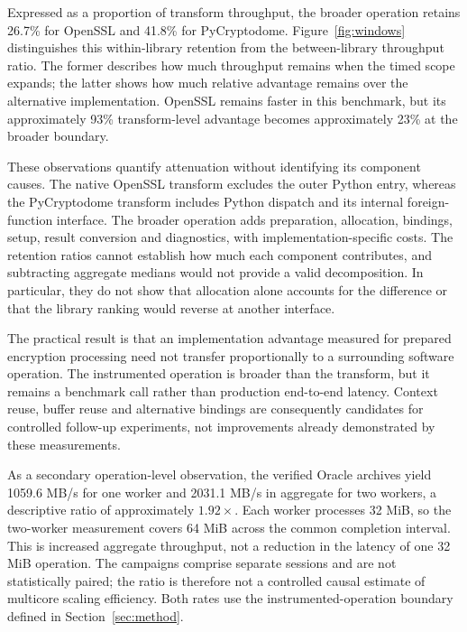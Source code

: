 Expressed as a proportion of transform throughput, the broader operation retains 26.7\% for OpenSSL and 41.8\% for PyCryptodome. Figure~\ref{fig:windows} distinguishes this within-library retention from the between-library throughput ratio. The former describes how much throughput remains when the timed scope expands; the latter shows how much relative advantage remains over the alternative implementation. OpenSSL remains faster in this benchmark, but its approximately 93\% transform-level advantage becomes approximately 23\% at the broader boundary.

These observations quantify attenuation without identifying its component causes. The native OpenSSL transform excludes the outer Python entry, whereas the PyCryptodome transform includes Python dispatch and its internal foreign-function interface. The broader operation adds preparation, allocation, bindings, setup, result conversion and diagnostics, with implementation-specific costs. The retention ratios cannot establish how much each component contributes, and subtracting aggregate medians would not provide a valid decomposition. In particular, they do not show that allocation alone accounts for the difference or that the library ranking would reverse at another interface.

The practical result is that an implementation advantage measured for prepared encryption processing need not transfer proportionally to a surrounding software operation. The instrumented operation is broader than the transform, but it remains a benchmark call rather than production end-to-end latency. Context reuse, buffer reuse and alternative bindings are consequently candidates for controlled follow-up experiments, not improvements already demonstrated by these measurements.

As a secondary operation-level observation, the verified Oracle archives yield 1059.6 MB/s for one worker and 2031.1 MB/s in aggregate for two workers, a descriptive ratio of approximately $1.92\times$. Each worker processes 32 MiB, so the two-worker measurement covers 64 MiB across the common completion interval. This is increased aggregate throughput, not a reduction in the latency of one 32 MiB operation. The campaigns comprise separate sessions and are not statistically paired; the ratio is therefore not a controlled causal estimate of multicore scaling efficiency. Both rates use the instrumented-operation boundary defined in Section~\ref{sec:method}.

